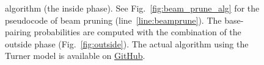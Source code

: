 \begin{figure}[t]
{algorithm (the inside phase).
See Fig.~\ref{fig:beam_prune_alg} for the pseudocode of beam pruning (line~\ref{line:beamprune}).
The base-pairing probabilities are computed with the combination of the outside phase
(Fig.~\ref{fig:outside}).
The actual algorithm using the Turner model is available on \href{https://github.com/LinearFold/LinearPartition}{GitHub}.
\label{fig:algorithm}}
\vspace{-.3cm}
\end{figure}
